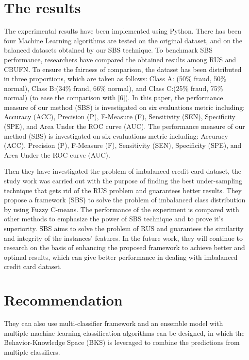 \documentclass[a4paper]{article}
\begin{document}
\section{The results}
 
The experimental results have been implemented using Python. There has been four Machine Learning algorithms are tested on the original dataset, and on the balanced datasets obtained by our SBS technique. To benchmark SBS performance, researchers have compared the obtained results among RUS and CBUFN. To ensure the fairness of comparison, the dataset has been distributed in three proportions, which are taken as follows: Class A: (50\% fraud, 50\% normal), Class B:(34\% fraud, 66\% normal), and Class C:(25\% fraud, 75\% normal) (to ease the comparison with [6]). In this paper, the performance measure of our method (SBS) is investigated on six evaluations metric including: Accuracy (ACC), Precision (P), F-Measure (F), Sensitivity (SEN), Specificity (SPE), and Area Under the ROC curve (AUC). The performance measure of our method (SBS) is investigated on six evaluations metric including: Accuracy (ACC), Precision (P), F-Measure (F), Sensitivity (SEN), Specificity (SPE), and Area Under the ROC curve (AUC). 

Then they have investigated the problem of imbalanced credit card dataset, the study work was carried out with the purpose of finding the best under-sampling technique that gets rid of the RUS problem and guarantees better results. They propose a framework (SBS) to solve the problem of imbalanced class distribution by using Fuzzy C-means. The performance of the experiment is compared with other methods to emphasize the power of SBS technique and to prove it’s superiority. SBS aims to solve the problem of RUS and guarantees the similarity and integrity of the instances’ features. In the future work, they will continue to research on the basis of enhancing the proposed framework to achieve better and optimal results, which can give better performance in dealing with imbalanced credit card dataset.
 

\section{Recommendation}

They can also use multi-classifier framework and an ensemble model with multiple machine learning classification algorithms can be designed, in which the Behavior-Knowledge Space (BKS) is leveraged to combine the predictions from multiple classifiers.
\end{document}
